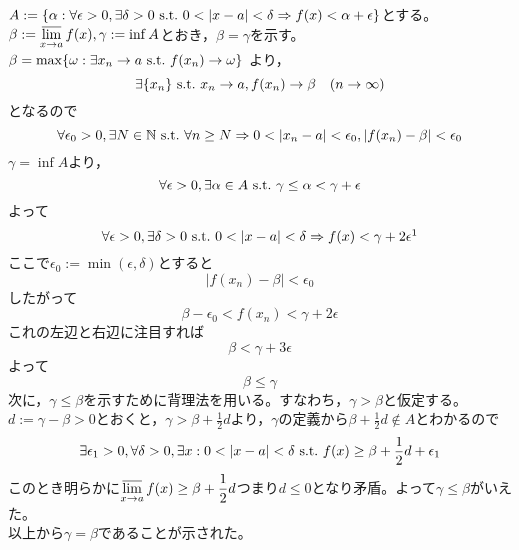 \documentclass[dvipdfmx,a4j,10pt]{jsarticle}
\makeatletter
\theoremstyle{mystyle1}
\theoremstyle{mystyle2}
\renewenvironment{proof}[1][\proofname]{\par
  \pushQED{\qed}%
  \normalfont
  \topsep6\p@\@plus6\p@ \trivlist
  \item[\hskip\labelsep{\bfseries\sffamily #1}]\ignorespaces
}{%
  \popQED\endtrivlist\@endpefalse
}
\renewcommand\proofname{証明}
\makeatother
\begin{document}
\begin{proof}[命題\ref{prop5.12}の証明]
    $A:=\{\alpha:\forall\epsilon>0,\exists\delta>0\ {\rm s.t.}\ 0<|x-a|<\delta \Rightarrow f(x)<\alpha+\epsilon\}$とする。
    $\displaystyle\beta:=\varlimsup_{x\to a}f(x),\gamma :=\inf{A}$とおき，$\beta=\gamma$を示す。\\
    $\beta=\max\{\omega:\exists x_n\to a \ {\rm s.t.}\ f(x_n)\to\omega\}$
    より，
    \[
    \exists\{x_n\} \ {\rm s.t.}\ x_n\to a,f(x_n)\to \beta \quad(n\to\infty)
    \]
    となるので
    \[
    \forall\epsilon_0>0,\exists N\in\mathbb{N} \ {\rm s.t.}\ \forall n\geq N \Rightarrow 0<|x_n-a|<\epsilon_0,|f(x_n)-\beta|<\epsilon_0
    \]
    $\gamma=\inf{A}$より，
    \[
    \forall \epsilon>0,\exists \alpha\in A \ {\rm s.t. } \ \gamma\leq\alpha<\gamma+\epsilon
    \]
    よって
    \[
    \forall\epsilon>0,\exists\delta>0 \ {\rm s.t.}\ 0<|x-a|<\delta \Rightarrow f(x)<\gamma+2\epsilon \footnotemark
    \]
    ここで$\epsilon_0:=\min(\epsilon,\delta)$とすると
    \[
    |f(x_n)-\beta|<\epsilon_0
    \]
    したがって
    \[
    \beta-\epsilon_0<f(x_n)<\gamma+2\epsilon
    \]
    これの左辺と右辺に注目すれば
    \[
    \beta<\gamma+3\epsilon
    \]
    よって
    \[
    \beta\leq\gamma
    \]
    次に，$\gamma\leq\beta$を示すために背理法を用いる。すなわち，$\gamma>\beta$と仮定する。\\
    $d:=\gamma-\beta>0$とおくと，$\displaystyle\gamma>\beta+\frac{1}{2}d$より，$\gamma$の定義から$\displaystyle\beta+\frac{1}{2}d\notin A$とわかるので
    \[
    \exists\epsilon_1>0,\forall\delta>0, \exists x:0<|x-a|<\delta \ {\rm s.t.} \ f(x)\geq\beta+\frac{1}{2}d+\epsilon_1
    \]
    このとき明らかに$\displaystyle \varlimsup_{x\to a}f(x)\geq\beta+\frac{1}{2}d$つまり$d\leq0$となり矛盾。よって$\gamma\leq\beta$がいえた。\\
    以上から$\gamma=\beta$であることが示された。
\end{proof}

\newpage
\end{document}
